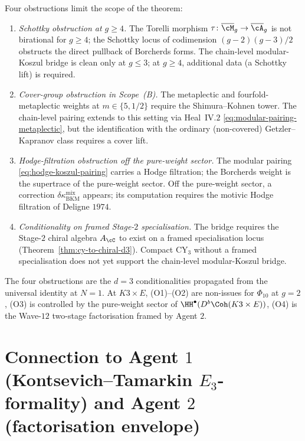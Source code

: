Four obstructions limit the scope of the theorem:
\begin{enumerate}[label=\textup{(O\arabic*)}]
\item \emph{Schottky obstruction at $g \geq 4$.} The Torelli morphism
$\tau \colon \overline{\cM}_g \to \overline{\cA}_g$ is not birational
for $g \geq 4$; the Schottky locus of codimension $(g - 2)(g - 3)/2$
obstructs the direct pullback of Borcherds forms. The chain-level
modular-Koszul bridge is clean only at $g \leq 3$; at $g \geq 4$,
additional data (a Schottky lift) is required.
\item \emph{Cover-group obstruction in Scope~(B).} The metaplectic and
fourfold-metaplectic weights at $m \in \{5, 1/2\}$ require the
Shimura--Kohnen tower. The chain-level pairing extends to this setting
via Heal~IV.$2$ \eqref{eq:modular-pairing-metaplectic}, but the
identification with the ordinary (non-covered) Getzler--Kapranov class
requires a cover lift.
\item \emph{Hodge-filtration obstruction off the pure-weight sector.}
The modular pairing \eqref{eq:hodge-koszul-pairing} carries a Hodge
filtration; the Borcherds weight is the supertrace of the pure-weight
sector. Off the pure-weight sector, a correction
$\delta \kappa_{\mathrm{BKM}}^{\mathrm{mix}}$ appears; its computation
requires the motivic Hodge filtration of Deligne $1974$.
\item \emph{Conditionality on framed Stage-$2$ specialisation.} The
bridge requires the Stage-$2$ chiral algebra $A_\cC$ to exist on a
framed specialisation locus (Theorem~\ref{thm:cy-to-chiral-d3}).
Compact CY$_3$ without a framed specialisation does not yet support the
chain-level modular-Koszul bridge.
\end{enumerate}

The four obstructions are the $d = 3$ conditionalities propagated from
the universal identity at $N = 1$. At $K3 \times E$, (O1)--(O2) are
non-issues for $\Phi_{10}$ at $g = 2$, (O3) is controlled by the
pure-weight sector of $\HH^\bullet(D^b\Coh(K3 \times E))$, (O4) is the
Wave-$12$ two-stage factorisation framed by Agent $2$.


\section{Connection to Agent $1$ (Kontsevich--Tamarkin $E_3$-formality)
and Agent $2$ (factorisation envelope)}
\label{sec:connection-agents-1-2}

